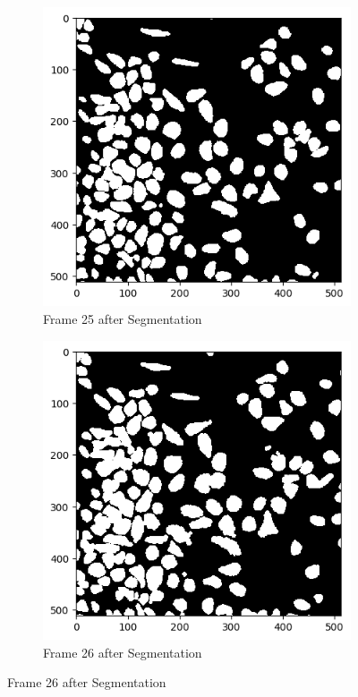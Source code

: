 \documentclass{article}
\begin{document}
\begin{figure}[h!]
  \centering
  \begin{subfigure}{0.4\textwidth}
    \includegraphics[width=\linewidth]{Report/Appendix_Images/Segmentation-A-Control/frame_25.png}
    \caption*{Frame 25 after Segmentation}
  \end{subfigure}
  \hfill
  \begin{subfigure}{0.4\textwidth}
    \includegraphics[width=\linewidth]{Report/Appendix_Images/Segmentation-A-Control/frame_26.png}
    \caption*{Frame 26 after Segmentation}
  \end{subfigure}


\end{figure}
\end{document}
